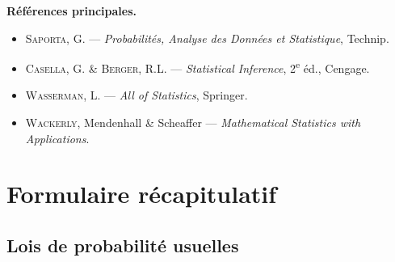 \documentclass[12pt,a4paper,twoside]{book}
\theoremstyle{definition}
\theoremstyle{plain}
\theoremstyle{remark}
\begin{document}
\medskip
\textbf{R\'ef\'erences principales.}
\begin{itemize}
\item \textsc{Saporta}, G. --- \emph{Probabilit\'es, Analyse des Donn\'ees et Statistique}, Technip.
\item \textsc{Casella}, G. \& \textsc{Berger}, R.L. --- \emph{Statistical Inference}, 2\textsuperscript{e} \'ed., Cengage.
\item \textsc{Wasserman}, L. --- \emph{All of Statistics}, Springer.
\item \textsc{Wackerly}, Mendenhall \& Scheaffer --- \emph{Mathematical Statistics with Applications}.
\end{itemize}

\mainmatter













\backmatter

\appendix
\chapter{Formulaire r\'ecapitulatif}
\label{app:formulaire}

\section{Lois de probabilit\'e usuelles}
\end{document}

